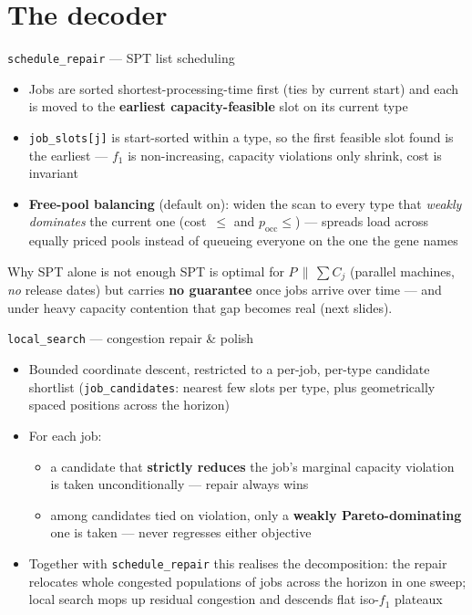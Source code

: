\documentclass[aspectratio=169,t]{beamer}
\newcommand{\code}[1]{\texttt{#1}}
\begin{document}
\section{The decoder}

\begin{frame}{\code{schedule\_repair} --- SPT list scheduling}
  \begin{itemize}
    \item Jobs are sorted \alert{shortest-processing-time first} (ties by
      current start) and each is moved to the \textbf{earliest capacity-feasible}
      slot on its current type
    \item \code{job\_slots[j]} is start-sorted within a type, so the first
      feasible slot found is the earliest --- $f_1$ is non-increasing,
      capacity violations only shrink, cost is invariant
    \item \textbf{Free-pool balancing} (default on): widen the scan to every
      type that \emph{weakly dominates} the current one (cost~$\le$ and
      $p_{\text{occ}}\le$) --- spreads load across equally priced pools instead
      of queueing everyone on the one the gene names
  \end{itemize}
  \begin{alertblock}{Why SPT alone is not enough}
    SPT is optimal for $P\,\|\,\sum C_j$ (parallel machines, \emph{no} release
    dates) but carries \textbf{no guarantee} once jobs arrive over time --- and
    under heavy capacity contention that gap becomes real (next slides).
  \end{alertblock}
\end{frame}

\begin{frame}{\code{local\_search} --- congestion repair \& polish}
  \begin{itemize}
    \item Bounded coordinate descent, restricted to a per-job, per-type
      candidate shortlist (\code{job\_candidates}: nearest few slots per type,
      plus geometrically spaced positions across the horizon)
    \item For each job:
    \begin{itemize}
      \item a candidate that \textbf{strictly reduces} the job's marginal
        capacity violation is taken unconditionally --- repair always wins
      \item among candidates tied on violation, only a \textbf{weakly
        Pareto-dominating} one is taken --- never regresses either objective
    \end{itemize}
    \item Together with \code{schedule\_repair} this realises the
      decomposition: the repair relocates whole congested populations of jobs
      across the horizon in one sweep; local search mops up residual
      congestion and descends flat iso-$f_1$ plateaux
  \end{itemize}
\end{frame}
\end{document}

